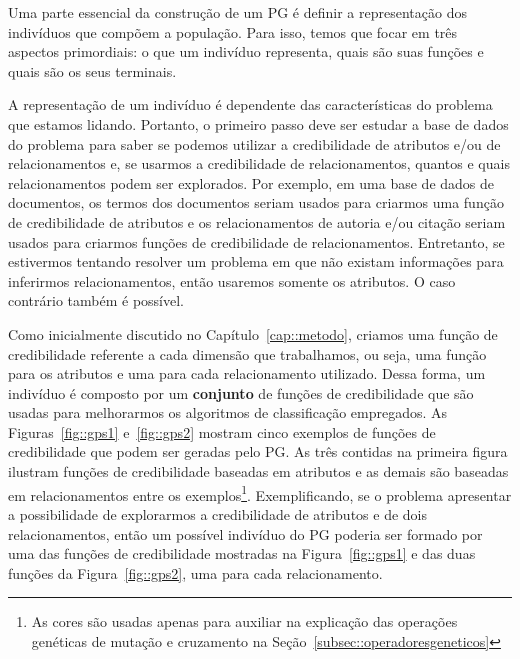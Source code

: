 Uma parte essencial da construção de um \textsc{PG} é definir a representação dos indivíduos que compõem a população.
Para isso, temos que focar em três aspectos primordiais: o que um indivíduo representa, quais são suas funções e quais são os seus terminais.

A representação de um indivíduo é dependente das características do problema que estamos lidando.
Portanto, o primeiro passo deve ser estudar a base de dados do problema para saber se podemos utilizar a credibilidade de atributos e/ou de relacionamentos e, se usarmos a credibilidade de relacionamentos, quantos e quais relacionamentos podem ser explorados.
Por exemplo, em uma base de dados de documentos, os termos dos documentos seriam usados para criarmos uma função de credibilidade de atributos e os relacionamentos de autoria e/ou citação seriam usados para criarmos funções de credibilidade de relacionamentos. Entretanto, se estivermos tentando resolver um problema em que não existam informações para inferirmos relacionamentos, então usaremos somente os atributos. O caso contrário também é possível.

Como inicialmente discutido no Capítulo~\ref{cap::metodo}, criamos uma função de credibilidade referente a cada dimensão que trabalhamos, ou seja, uma função para os atributos e uma para cada relacionamento utilizado. Dessa forma, um indivíduo é composto por um \textbf{conjunto} de funções de credibilidade que são usadas para melhorarmos os algoritmos de classificação empregados.
As Figuras~\ref{fig::gps1} e~\ref{fig::gps2} mostram cinco exemplos de funções de credibilidade que podem ser geradas pelo \textsc{PG}. As três contidas na primeira figura ilustram funções de credibilidade baseadas em atributos e as demais são baseadas em relacionamentos entre os exemplos\footnote{As cores são usadas apenas para auxiliar na explicação das operações genéticas de mutação e cruzamento na Seção~\ref{subsec::operadoresgeneticos}}.
Exemplificando, se o problema apresentar a possibilidade de explorarmos a credibilidade de atributos e de dois relacionamentos, então um possível indivíduo do \textsc{PG} poderia ser formado por uma das funções de credibilidade mostradas na Figura~\ref{fig::gps1} e das duas funções da Figura~\ref{fig::gps2}, uma para cada relacionamento.

